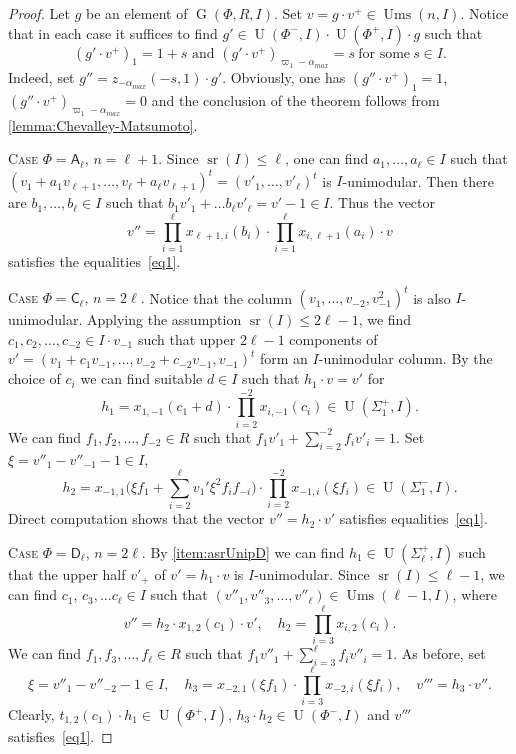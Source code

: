 \documentclass[11pt]{amsart}
\theoremstyle{plain}
\numberwithin{equation}{section}
\numberwithin{lemma}{section}
\theoremstyle{definition}
\theoremstyle{remark}
\DeclareMathOperator{\G}{G}
\DeclareMathOperator{\U}{U}
\DeclareMathOperator{\sr}{sr}
\DeclareMathOperator{\Ums}{Ums}
\newcommand{\rA}{\mathsf{A}}
\newcommand{\rC}{\mathsf{C}}
\newcommand{\rD}{\mathsf{D}}
\begin{document}
\begin{proof}

Let $g$ be an element of $\G(\Phi, R, I)$. Set $v=g \cdot v^+\in\Ums(n, I)$. 
Notice that in each case it suffices to find $g' \in \U(\Phi^-, I) \cdot \U(\Phi^+, I) \cdot g$ such that 
\begin{equation} \label{eq1} (g'\cdot v^+)_{1} = 1 + s \text{ and } (g'\cdot v^+)_{\varpi_{1}-\alpha_{max}} = s\ \text{for some}\ s\in I. \end{equation}
Indeed, set $g'' = z_{-\alpha_{max}}(-s, 1) \cdot g'$.
Obviously, one has $(g''\cdot v^+)_1 = 1$, $(g''\cdot v^+)_{\varpi_{1}-\alpha_{max}}=0$ and the conclusion of the theorem follows from \cref{lemma:Chevalley-Matsumoto}.

\textsc{Case $\Phi=\rA_\ell$, $n=\ell + 1$.}
Since $\sr(I)\leqslant\ell$, one can find $a_1, \ldots, a_\ell\in I$ such that $(v_1+a_1v_{\ell+1}, \ldots, v_\ell+a_\ell v_{\ell+1})^t=(v'_1, \ldots, v'_\ell)^t$ is $I$-unimodular.
Then there are $b_1, \ldots, b_\ell\in I$ such that $b_1v'_1+\ldots b_\ell v'_\ell=v'-1\in I$. 
Thus the vector \[ v'' = \prod_{i=1}^\ell x_{\ell+1, i}(b_i) \cdot \prod_{i=1}^\ell x_{i, \ell+1}(a_i) \cdot v \]
satisfies the equalities~\eqref{eq1}.

\textsc{Case $\Phi=\rC_\ell$, $n=2\ell$.}
Notice that the column $(v_1, \ldots, v_{-2}, v_{-1}^2)^t$ is also $I$-unimodular.
Applying the assumption $\sr(I)\leqslant 2\ell-1$, we find $c_1, c_2, \ldots, c_{-2} \in I \cdot v_{-1}$ such that upper $2\ell -1$ components of $v'=(v_1 + c_1 v_{-1}, \ldots, v_{-2} + c_{-2}v_{-1}, v_{-1})^t$ form an $I$-unimodular column.
By the choice of $c_i$ we can find suitable $d\in I$ such that $h_1 \cdot v = v'$ for
\[ h_1 = x_{1, -1}(c_1 + d) \cdot \prod_{i=2}^{-2} x_{i, -1}(c_i) \in \U(\Sigma_1^+, I). \]
We can find $f_1, f_2, \ldots, f_{-2} \in R$ such that $f_1v'_1+\sum_{i=2}^{-2} f_i v'_i = 1$.
Set $\xi = v''_1-v''_{-1}-1 \in I$, 
\[ h_2 = x_{-1, 1}\biggl(\xi f_1 + \sum_{i=2}^\ell v_1' \xi^2 f_i f_{-i}\biggr) \cdot \prod_{i=2}^{-2} x_{-1, i}(\xi f_i) \in \U(\Sigma_1^-, I). \]
Direct computation shows that the vector $v'' = h_2 \cdot v'$ satisfies equalities~\eqref{eq1}.

\textsc{Case $\Phi=\rD_\ell$, $n= 2\ell$.} 
By \cref{item:asrUnipD} we can find $h_1\in \U(\Sigma^+_\ell, I)$ such that the upper half $v'_+$ of $v'=h_1 \cdot v$ is $I$-unimodular.
Since $\sr(I)\leqslant \ell-1$, we can find $c_1$, $c_3, \ldots c_\ell \in I$ such that $(v''_1, v''_3, \ldots, v''_\ell) \in \Ums(\ell-1, I)$, where
\[ v''=h_2 \cdot x_{1, 2}(c_1) \cdot v', \quad h_2=\prod_{i=3}^\ell x_{i, 2}(c_i). \]
We can find $f_1, f_3, \ldots, f_\ell \in R$ such that $f_1v''_1+\sum_{i=3}^\ell f_i v''_{i} = 1$.
As before, set
\[ \xi = v''_1-v''_{-2}-1 \in I, \quad h_3 = x_{-2, 1}(\xi f_1) \cdot \prod_{i=3}^\ell x_{-2, i}(\xi f_i), \quad v'''=h_3 \cdot v''. \]
Clearly, $t_{1, 2}(c_1) \cdot h_1 \in \U(\Phi^+, I)$, $ h_3 \cdot h_2 \in \U(\Phi^-, I)$ and $v'''$ satisfies~\eqref{eq1}.


\end{proof}
\end{document}
